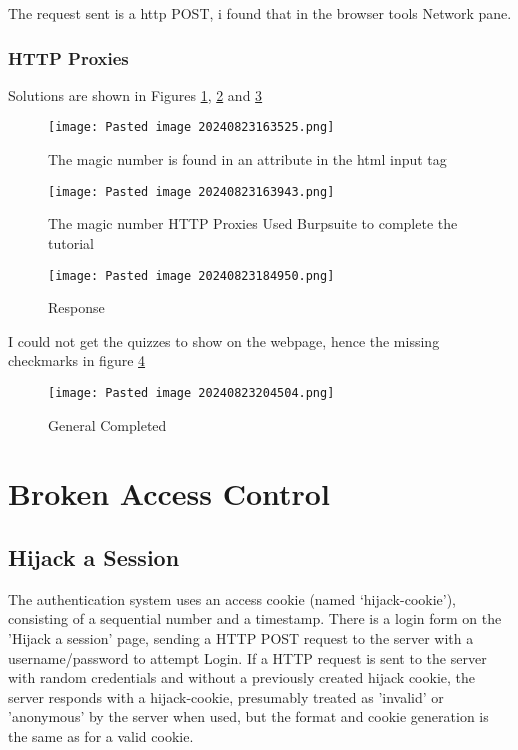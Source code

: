 \documentclass[
	letterpaper, %
	10pt, %
	unnumberedsections, %
	twoside, %
]{APAAssignment}
\begin{document}
\begin{appendices}
The request sent is a http POST, i found that in the browser tools
Network pane. 

\subsubsection{HTTP Proxies} Solutions are shown in Figures \ref{fig:MajickNo}, \ref{fig:MajickNoBurp} and \ref{fig:MajickGET}

\begin{figure}[!hbt] %
	\centering
	\texttt{[image: Pasted image 20240823163525.png]}
	\caption{The magic	number is found in an attribute in the html input tag\\}
	\label{fig:MajickNo}
\end{figure}

\begin{figure}[!hbt] %
	\centering
	\texttt{[image: Pasted image 20240823163943.png]}
	\caption{The magic number  HTTP Proxies Used Burpsuite to complete the tutorial}
	\label{fig:MajickNoBurp}
\end{figure}


\begin{figure}[!hbt] 
	\centering
	\texttt{[image: Pasted image 20240823184950.png]}
	\caption{Response}
	\label{fig:MajickGET}
\end{figure}

I could not get the quizzes to show on the webpage, hence the missing checkmarks in figure \ref{fig:GeneralCompleted}  

\begin{figure} [!hbt]
	\centering
	\texttt{[image: Pasted image 20240823204504.png]}
	\caption{General Completed}
	\label{fig:GeneralCompleted}
\end{figure}

\clearpage

\section{Broken Access Control}\label{app:BrokenAccessControl} 

\subsection{Hijack a Session}
The authentication system uses an access cookie (named `hijack-cookie'), consisting of a sequential number and a timestamp. There is a login form on the 'Hijack a session' page, sending a HTTP POST request to the server with a username/password to attempt Login. If a HTTP request is sent to the server with random credentials and without a previously created hijack cookie, the server responds with a hijack-cookie, presumably treated as 'invalid' or 'anonymous' by the server when used, but the format and cookie generation is the same as for a valid cookie.


\end{appendices}
\end{document}
